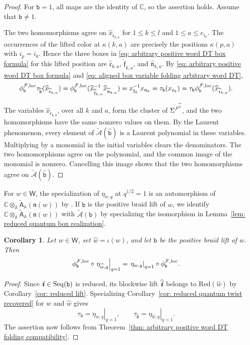 \documentclass[12pt, leqno]{amsart}
\numberwithin{equation}{section}
\theoremstyle{plain}
\newtheorem{corollary}[lemma]{Corollary}
\theoremstyle{definition}
\renewcommand{\le}{\leqslant}
\newcommand{\n}{\mathfrak{n}}
\newcommand{\C}{\mathbb{C}}
\newcommand{\loc}{{\rm loc}}
\newcommand{\ii}{ \textbf{\textit{i}}}
\newcommand{\hw}{\widehat{w}}
\newcommand{\hx}{\widehat{x}}
\newcommand{\hii}{{\widehat{\ii}}}
\newcommand{\frakc}{\mathfrak{c}}
\newcommand{\frakf}{\mathfrak{f}}
\newcommand{\frakn}{\mathfrak{n}}
\newcommand{\hfrakc}{\widehat{\frakc}}
\newcommand{\hfrakf}{\widehat{\frakf}}
\newcommand{\hfrakn}{\widehat{\frakn}}
\newcommand{\sfA}{\mathsf{A}}
\newcommand{\sfW}{\mathsf{W}}
\newcommand{\tsfA}{\widetilde{\sfA}}
\newcommand{\bbA}{\mathbb{A}}
\newcommand{\calA}{\mathcal{A}}
\newcommand{\calF}{\mathcal{F}}
\newcommand{\tcalA}{\widetilde{\calA}}
\newcommand{\ttb}{\mathtt{b}}
\newcommand{\httb}{\widehat{\ttb}}
\newcommand{\weyl}{\sfW}
\newcommand{\Red}{\mathrm{Red}}
\newcommand{\Seq}{\mathrm{Seq}}
\begin{document}
\begin{proof}
For $\ttb=1$, all maps are the identity of $\C$, so the assertion
holds.  Assume that $\ttb\ne1$.

The two homomorphisms agree on
$\hx_{\hfrakc_{k,a}}$ for $1\le k\le l$ and $1\le a\le e_{i_k}$.
The occurrences of the
lifted color at $\kappa(k,a)$ are precisely the positions
$\kappa(p,a)$ with $i_p=i_k$.  Hence the three boxes in
\eqref{eq: arbitrary positive word DT box formula} for this lifted
position are $\hfrakc_{k,a}$, $\hfrakf_{k,a}$, and
$\hfrakn_{k,a}$.  By \eqref{eq: arbitrary positive word DT box formula}
and \eqref{eq: aligned box variable folding arbitrary word DT},
\[
\begin{aligned}
\phi^{\calF,\loc}_\ttb\tau_{\httb}
 (\hx_{\hfrakc_{k,a}})
=\phi^{\calF,\loc}_\ttb
 (\hx_{\hfrakf_{k,a}}^{-1}\hx_{\hfrakn_{k,a}})
=x_{\frakf_k}^{-1}x_{\frakn_k}
=\tau_\ttb(x_{\frakc_k})
=\tau_\ttb\phi^{\calF,\loc}_\ttb
 (\hx_{\hfrakc_{k,a}}).
\end{aligned}
\]

The variables $\hx_{\hfrakc_{k,a}}$, over all $k$ and $a$, form the
cluster of $\Sigma^{\calF^\hii}$, and the two homomorphisms have
the same nonzero values on them.
By the Laurent phenomenon, every element of
$\tcalA(\httb)$ is a Laurent polynomial in these
variables.  Multiplying by a monomial in the initial variables
clears the denominators.  The two homomorphisms agree on the polynomial, and the common image of the monomial is
nonzero.  Cancelling this image shows that the two homomorphisms
agree on
$\tcalA(\httb)$.
\end{proof}

For $w\in\weyl$, the specialization of $\eta_{w,q}$ at
$q^{1/2}=1$ is an automorphism of
$\C\otimes_\bbA\tsfA_\bbA(\n(w))$ by
\cite[Corollary~6.2]{KimuraOya21}.
If $\ttb$ is the positive braid lift of $w$, we identify
$\C\otimes_\bbA\tsfA_\bbA(\n(w))$ with
$\tcalA(\ttb)$ by specializing the isomorphism in
Lemma~\ref{lem: reduced quantum box realization}.

\begin{corollary}
\label{cor: reduced twist recovered by arbitrary word DT}
Let $w\in\weyl$, set $\hw=\iota(w)$, and let $\ttb$ be the
positive braid lift of $w$.
Then
\[
\phi^{\calF,\loc}_\ttb\circ
\left.\eta_{\hw,q}\right|_{q=1}
=\left.\eta_{w,q}\right|_{q=1}
\circ\phi^{\calF,\loc}_\ttb.
\]
\end{corollary}

\begin{proof}
Since $\ii\in\Seq(\ttb)$  is reduced, its blockwise lift $\hii${}
belongs to $\Red(\hw)$ by Corollary~\ref{cor: reduced lift}.
Specializing Corollary~\ref{cor: reduced quantum twist recovered}
for $w$ and $\hw$ gives
\[
\tau_\ttb=\left.\eta_{w,q}\right|_{q=1},
\qquad
\tau_{\httb}=\left.\eta_{\hw,q}\right|_{q=1}.
\]
The assertion now follows from
Theorem~\ref{thm: arbitrary positive word DT folding compatibility}.
\end{proof}
\end{document}
